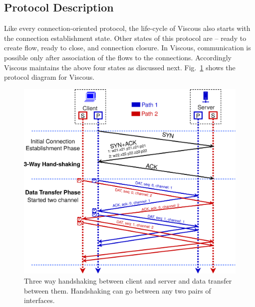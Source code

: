 \subsection{Protocol Description}
Like every connection-oriented protocol, the life-cycle of Viscous also starts with the connection establishment state.
Other states of this protocol are -- ready to create flow,  ready to close, and  connection closure.
In Viscous, communication is possible only after association of the flows to the connections. Accordingly Viscous maintains the above four states as discussed next. Fig.~\ref{fig:ProtocolDiagram} shows the protocol diagram for Viscous. 

\begin{figure}[!ht]
	\centering
	\includegraphics[width=1\linewidth]{img/ProtocolDiagram}
	\caption{Three way handshaking between client and server and data transfer between them. Handshaking can go between any two pairs of interfaces.}
	\label{fig:ProtocolDiagram}
\end{figure}


